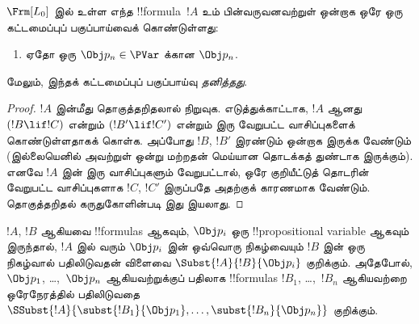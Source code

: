 \documentclass[../../../include/open-logic-section]{subfiles}
\begin{document}
\begin{prop}[தனித்த வாசிப்புத்தன்மை]
$ \Frm[L_0]$ இல் உள்ள எந்த !!{formula}~$!A$ உம் பின்வருவனவற்றுள் ஒன்றாக
ஒரே ஒரு கட்டமைப்புப் பகுப்பாய்வைக் கொண்டுள்ளது:
\begin{enumerate}


\item ஏதோ ஒரு $\Obj p_n \in  \PVar$ க்கான $\Obj p_n$.





\end{enumerate}
மேலும், இந்தக் கட்டமைப்புப் பகுப்பாய்வு \emph{தனித்தது}.
\end{prop}

\begin{proof}
$!A$ இன்மீது தொகுத்தறிதலால் நிறுவுக. எடுத்துக்காட்டாக, $!A$ ஆனது
$(!B \lif !C)$ என்றும் $(!B' \lif !C')$ என்றும் இரு வேறுபட்ட
வாசிப்புகளைக் கொண்டுள்ளதாகக் கொள்க. அப்போது $!B$, $!B'$ இரண்டும் ஒன்றாக
இருக்க வேண்டும் (இல்லையெனில் அவற்றுள் ஒன்று மற்றதன் மெய்யான தொடக்கத்
துண்டாக இருக்கும்). எனவே $!A$ இன் இரு வாசிப்புகளும் வேறுபட்டால், ஒரே
குறியீட்டுத் தொடரின் வேறுபட்ட வாசிப்புகளாக $!C$, $!C'$ இருப்பதே அதற்குக்
காரணமாக வேண்டும். தொகுத்தறிதல் கருதுகோளின்படி இது இயலாது.
\end{proof}


\begin{defn}[ஒரேசீரான பதிலீடு]
$!A$, $!B$ ஆகியவை !!{formula}s ஆகவும், $\Obj p_i$ ஒரு !!{propositional
variable} ஆகவும் இருந்தால், $!A$ இல் வரும் $\Obj p_i$ இன் ஒவ்வொரு
நிகழ்வையும் $!B$ இன் ஒரு நிகழ்வால் பதிலிடுவதன் விளைவை
$\Subst{!A}{!B}{\Obj p_i}$ குறிக்கும். அதேபோல், $\Obj p_1$, \dots,~$\Obj p_n$
ஆகியவற்றுக்குப் பதிலாக !!{formula}s $!B_1$, \dots,~$!B_n$ ஆகியவற்றை
ஒரேநேரத்தில் பதிலிடுவதை
$\SSubst{!A}{\subst{!B_1}{\Obj p_1},\dots,\subst{!B_n}{\Obj p_n}}$ குறிக்கும்.
\end{defn}
\end{document}
